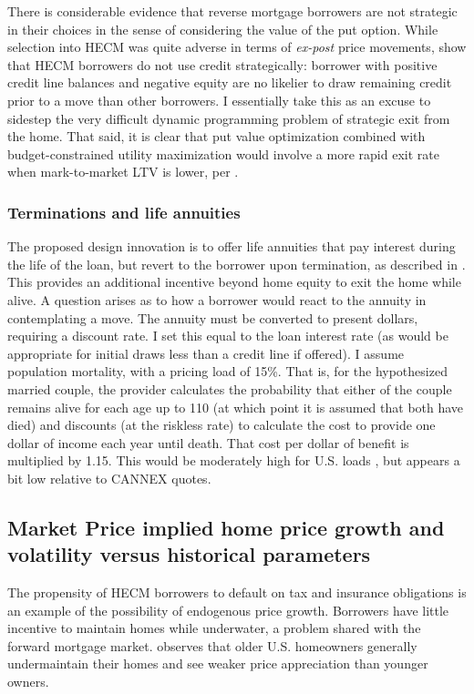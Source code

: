 \documentclass[12pt]{article}
\begin{document}
There is considerable evidence that reverse mortgage borrowers are not
strategic in their choices in the sense of considering the value of the put
option. While selection into HECM was quite adverse in terms of \emph{ex-post}
price movements, \textcite{DavidoffWetzel} show that HECM borrowers do not use
credit strategically: borrower with positive credit line balances and negative
equity are no likelier to draw remaining credit prior to a move than other
borrowers. I essentially take this as an excuse to sidestep the very difficult
dynamic programming problem of strategic exit from the home. That said, it is
clear that put value optimization combined with budget-constrained utility
maximization would involve a more rapid exit rate when mark-to-market LTV is
lower, per \textcite{DavidoffWelke}.

\subsubsection{Terminations and life annuities}

The proposed design innovation is to offer life annuities that pay interest
during the life of the loan, but revert to the borrower upon termination, as
described in \textcite{DavidoffBrookings}. This provides an additional
incentive beyond home equity to exit the home while alive. A question arises as
to how a borrower would react to the annuity in contemplating a move. The
annuity must be converted to present dollars, requiring a discount rate. I set
this equal to the loan interest rate (as would be appropriate for initial draws
less than a credit line if offered). I assume population mortality, with a
pricing load of 15\%. That is, for the hypothesized married couple, the
provider calculates the probability that either of the couple remains alive for
each age up to 110 (at which point it is assumed that both have died) and
discounts (at the riskless rate) to calculate the cost to provide one dollar of
income each year until death. That cost per dollar of benefit is multiplied by
1.15. This would be moderately high for U.S.  loads \textcite{Lockwood}, but
appears a bit low relative to CANNEX quotes.

\subsection{Market Price implied home price growth and volatility versus historical parameters}

The propensity of HECM borrowers to default on tax and insurance obligations is
an example of the possibility of endogenous price growth. Borrowers have little
incentive to maintain homes while underwater, a problem shared with the forward
mortgage market. \textcite{Davidoffhomemaint} observes that older U.S.
homeowners generally undermaintain their homes and see weaker price
appreciation than younger owners.
\end{document}
